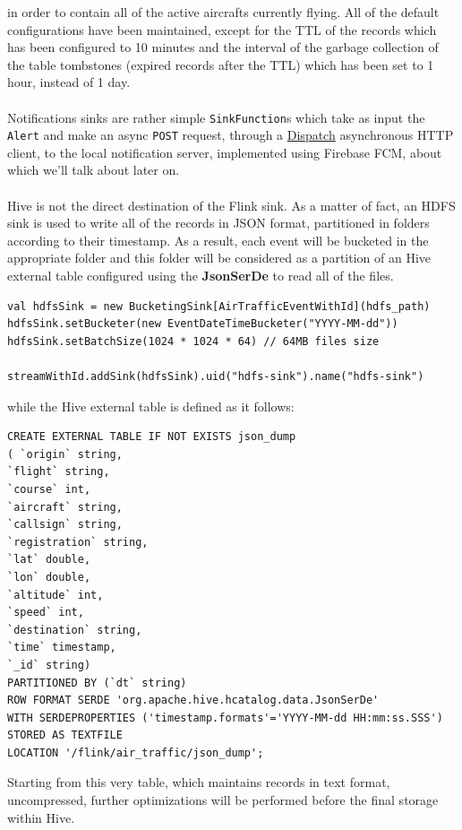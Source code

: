 in order to contain all of the active aircrafts currently flying. All of the default configurations have been maintained, except for the TTL of the records which has been configured to 10 minutes and the interval of the garbage collection of the table tombstones (expired records after the TTL) which has been set to 1 hour, instead of 1 day.
\\\\
Notifications sinks are rather simple \texttt{SinkFunction}s which take as input the \texttt{Alert} and make an async \texttt{POST} request, through a \href{https://dispatchhttp.org/Dispatch.html}{Dispatch} asynchronous HTTP client, to the local notification server, implemented using Firebase FCM, about which we'll talk about later on.
\\\\
Hive is not the direct destination of the Flink sink. As a matter of fact, an HDFS sink is used to write all of the records in JSON format, partitioned in folders according to their timestamp. As a result, each event will be bucketed in the appropriate folder and this folder will be considered as a partition of an Hive external table configured using the \textbf{JsonSerDe} to read all of the files.

\begin{verbatim}
val hdfsSink = new BucketingSink[AirTrafficEventWithId](hdfs_path)
hdfsSink.setBucketer(new EventDateTimeBucketer("YYYY-MM-dd"))
hdfsSink.setBatchSize(1024 * 1024 * 64) // 64MB files size

streamWithId.addSink(hdfsSink).uid("hdfs-sink").name("hdfs-sink")
\end{verbatim}

while the Hive external table is defined as it follows:

\begin{verbatim}
CREATE EXTERNAL TABLE IF NOT EXISTS json_dump
( `origin` string,
`flight` string,
`course` int,
`aircraft` string,
`callsign` string,
`registration` string,
`lat` double,
`lon` double,
`altitude` int,
`speed` int,
`destination` string,
`time` timestamp,
`_id` string)
PARTITIONED BY (`dt` string)
ROW FORMAT SERDE 'org.apache.hive.hcatalog.data.JsonSerDe'
WITH SERDEPROPERTIES ('timestamp.formats'='YYYY-MM-dd HH:mm:ss.SSS')
STORED AS TEXTFILE
LOCATION '/flink/air_traffic/json_dump';
\end{verbatim}

Starting from this very table, which maintains records in text format, uncompressed, further optimizations will be performed before the final storage within Hive.


